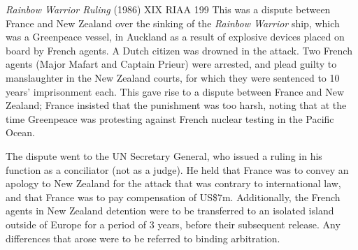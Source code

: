 \begin{casedetails}{\textit{Rainbow Warrior Ruling} (1986) XIX RIAA 199}
    \flushleft
    This was a dispute between France and New Zealand over the sinking of the \textit{Rainbow Warrior} ship, which was a Greenpeace vessel, in Auckland as a result of explosive devices placed on board by French agents. A Dutch citizen was drowned in the attack. Two French agents (Major Mafart and Captain Prieur) were arrested, and plead guilty to manslaughter in the New Zealand courts, for which they were sentenced to 10 years' imprisonment each. This gave rise to a dispute between France and New Zealand; France insisted that the punishment was too harsh, noting that at the time Greenpeace was protesting against French nuclear testing in the Pacific Ocean.

    \vspace{\baselineskip}

    The dispute went to the UN Secretary General, who issued a ruling in his function as a conciliator (not as a judge). He held that France was to convey an apology to New Zealand for the attack that was contrary to international law, and that France was to pay compensation of US\$7m. Additionally, the French agents in New Zealand detention were to be transferred to an isolated island outside of Europe for a period of 3 years, before their subsequent release. Any differences that arose were to be referred to binding arbitration.
\end{casedetails}

